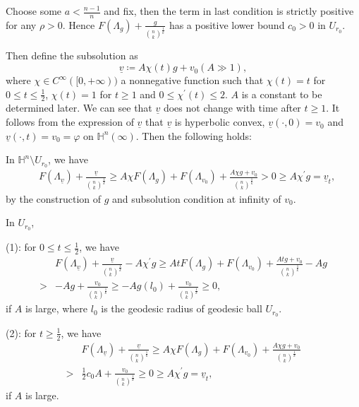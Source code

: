 \documentclass[reqno]{amsart}
\theoremstyle{remark}
\theoremstyle{definition}
\numberwithin{equation}{section}
\begin{document}
Choose some $a < \frac{n-1}{n}$ and fix, then the term in last condition is strictly positive for any $\rho>0$. Hence $F(\Lambda_{g}) + \frac{g}{\binom{n}{k}^{\frac{1}{k}}}$ has a positive lower bound $c_0>0$ in $U_{r_0}$. 

Then define the subsolution as
\[
\underline{v} \coloneqq A\chi(t)g + v_0 \left( A \gg 1 \right),
\]
where $\chi \in C^{\infty}([0, +\infty))$ a nonnegative function such that $\chi(t) = t$ for $0 \leqslant t \leqslant \frac{1}{2}$, $\chi(t) = 1$ for $t \geqslant 1$ and $0\leqslant \chi^{\prime}(t) \leqslant 2$. $A$ is a constant to be determined later. We can see that $\underline{v}$ does not change with time after $t \geqslant 1$. It follows from the expression of $\underline{v}$ that $\underline{v}$ is hyperbolic convex, $\underline{v}(\cdot, 0) = v_0$ and $\underline{v}(\cdot, t) = v_0 = \varphi$ on $\mathbb{H}^n(\infty)$. 
Then the following holds:

In $\mathbb{H}^n \setminus U_{r_0}$, we have
\begin{align*}
    &F(\Lambda_{\underline{v}}) + \frac{\underline{v}}{\binom{n}{k}^{\frac{1}{k}}} 
    \geqslant A\chi F(\Lambda_{g}) + F(\Lambda_{v_0}) + \frac{A\chi g + v_0}{\binom{n}{k}^{\frac{1}{k}}}
    > 0 \geqslant A\chi^{\prime}g = \underline{v}_t,
\end{align*}
by the construction of $g$ and subsolution condition at infinity of $v_0$.

In $U_{r_0}$, 

(1): for $0 \leqslant t \leqslant \frac{1}{2}$, we have
\begin{align*}
    &F(\Lambda_{\underline{v}}) + \frac{\underline{v}}{\binom{n}{k}^{\frac{1}{k}}} - A\chi^{\prime}g 
    \geqslant At F(\Lambda_{g}) + F(\Lambda_{v_0}) + \frac{Atg + v_0}{\binom{n}{k}^{\frac{1}{k}}} - Ag \\
    >& -Ag + \frac{v_0}{\binom{n}{k}^{\frac{1}{k}}}
    \geqslant -Ag(l_0) + \frac{v_0}{\binom{n}{k}^{\frac{1}{k}}} 
    \geqslant 0,
\end{align*}
if $A$ is large, where $l_0$ is the geodesic radius of geodesic ball $U_{r_0}$.

(2): for $t \geqslant \frac{1}{2}$, we have
\begin{align*}
    &F(\Lambda_{\underline{v}}) + \frac{\underline{v}}{\binom{n}{k}^{\frac{1}{k}}} 
    \geqslant A\chi F(\Lambda_{g}) + F(\Lambda_{v_0}) + \frac{A\chi g + v_0}{\binom{n}{k}^{\frac{1}{k}}} \\
    >& \frac{1}{2} c_0 A + \frac{v_0}{\binom{n}{k}^{\frac{1}{k}}} 
    \geqslant 0 \geqslant A\chi^{\prime}g = \underline{v}_t,
\end{align*}
if $A$ is large.
\end{document}
